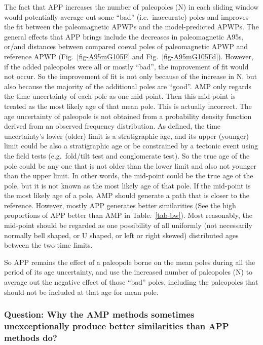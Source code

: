 The fact that APP increases the number of paleopoles (N) in each sliding window
would potentially average out some ``bad'' (i.e.\ inaccurate) poles and improves
the fit between the paleomagnetic APWPs and the model-predicted APWPs. The
general effects that APP brings include the decreases in paleomagnetic A95s,
or/and distances between compared coeval poles of paleomagnetic APWP and
reference APWP (Fig.~\ref{fig-A95mG105F} and Fig.~\ref{fig-A95mG105Fd}).
However, if the added paleopoles were all or mostly ``bad'', the improvement of
fit would not occur. So the improvement of fit is not only because of the
increase in N, but also because the majority of the additional poles are
``good''. AMP only regards the time uncertainty of each pole as one mid-point.
Then this mid-point is treated as the most likely age of that mean pole. This is
actually incorrect. The age uncertainty of paleopole is not obtained from a
probability density function derived from an observed frequency distribution. As
defined, the time uncertainty's lower (older) limit is a stratigraphic age, and
its upper (younger) limit could be also a stratigraphic age or be constrained by
a tectonic event using the field tests (e.g.\ fold/tilt test and conglomerate
test). So the true age of the pole could be any one that is not older than the
lower limit and also not younger than the upper limit. In other words, the
mid-point could be the true age of the pole, but it is not known as the most
likely age of that pole. If the mid-point is the most likely age of a pole, AMP
should generate a path that is closer to the reference. However, mostly APP
generates better similarities (See the high proportions of APP better than AMP
in Table.~\ref{tab-bw}). Most reasonably, the mid-point should be regarded as
one possibility of all uniformly (not necessarily normally bell shaped, or U
shaped, or left or right skewed) distributed ages between the two time limits.

So APP remains the effect of a paleopole borne on the mean poles during all the
period of its age uncertainty, and use the increased number of paleopoles (N)
to average out the negative effect of those ``bad'' poles, including the
paleopoles that should not be included at that age for mean pole.

\subsubsection{Question: Why the AMP methods sometimes unexceptionally produce
better similarities than APP methods do?}

